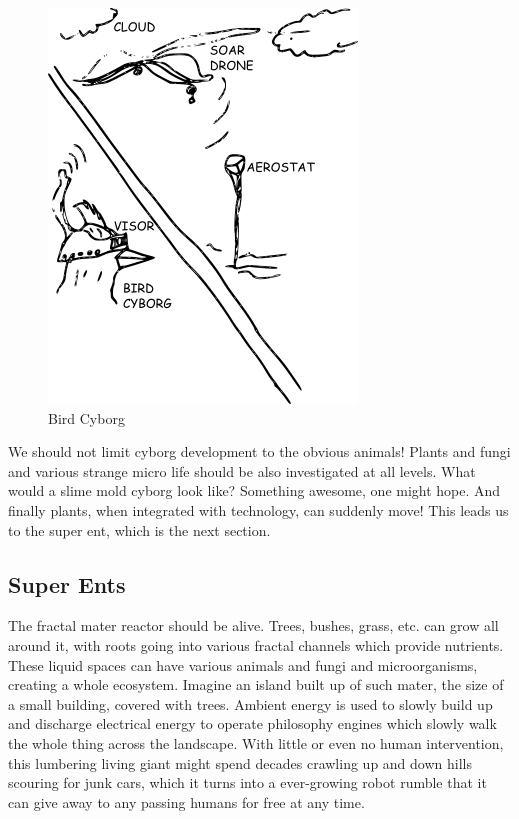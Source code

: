 \begin{figure}[htbp]
\centering
\includegraphics{images/birdcyborg.png}
\caption{Bird Cyborg}
\end{figure}

We should not limit cyborg development to the obvious animals! Plants
and fungi and various strange micro life should be also investigated at
all levels. What would a slime mold cyborg look like? Something awesome,
one might hope. And finally plants, when integrated with technology, can
suddenly move! This leads us to the super ent, which is the next
section.

\subsection{Super Ents}\label{super-ents}

The fractal mater reactor should be alive. Trees, bushes, grass, etc.
can grow all around it, with roots going into various fractal channels
which provide nutrients. These liquid spaces can have various animals
and fungi and microorganisms, creating a whole ecosystem. Imagine an
island built up of such mater, the size of a small building, covered
with trees. Ambient energy is used to slowly build up and discharge
electrical energy to operate philosophy engines which slowly walk the
whole thing across the landscape. With little or even no human
intervention, this lumbering living giant might spend decades crawling
up and down hills scouring for junk cars, which it turns into a
ever-growing robot rumble that it can give away to any passing humans
for free at any time.

